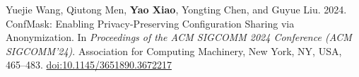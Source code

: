 Yuejie Wang, Qiutong Men, \textbf{Yao Xiao}, Yongting Chen, and Guyue Liu. 2024. ConfMask: Enabling Privacy-Preserving Configuration Sharing via Anonymization. In \textit{Proceedings of the ACM SIGCOMM 2024 Conference (ACM SIGCOMM'24)}. Association for Computing Machinery, New York, NY, USA, 465--483. \href{https://doi.org/10.1145/3651890.3672217}{doi:10.1145/3651890.3672217}
